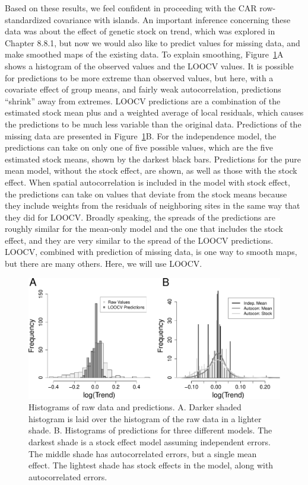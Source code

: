 \documentclass[12pt, titlepage]{article}
\begin{document}
Based on these results, we feel confident in proceeding with the CAR row-standardized covariance with islands.  An important inference concerning these data was about the effect of genetic stock on trend, which was explored in Chapter 8.8.1, but now we would also like to predict values for missing data, and make smoothed maps of the existing data.  To explain smoothing, Figure~\ref{Fig:seals_predhisto}A shows a histogram of the observed values and the LOOCV values.  It is possible for predictions to be more extreme than observed values, but here, with a covariate effect of group means, and fairly weak autocorrelation, predictions ``shrink'' away from extremes.  LOOCV predictions are a combination of the estimated stock mean plus and a weighted average of local residuals, which causes the predictions to be much less variable than the original data.  Predictions of the missing data are presented in Figure~\ref{Fig:seals_predhisto}B. For the independence model, the predictions can take on only one of five possible values, which are the five estimated stock means, shown by the darkest black bars.  Predictions for the pure mean model, without the stock effect, are shown, as well as those with the stock effect.  When spatial autocorrelation is included in the model with stock effect, the predictions can take on values that deviate from the stock means because they include weights from the residuals of neighboring sites in the same way that they did for LOOCV.  Broadly speaking, the spreads of the predictions are roughly similar for the mean-only model and the one that includes the stock effect, and they are very similar to the spread of the LOOCV predictions.  LOOCV, combined with prediction of missing data, is one way to smooth maps, but there are many others.  Here, we will use LOOCV.
\begin{figure}[H]
  \begin{center}
	    \includegraphics[width=.9\linewidth]{seal_predhist}
  \end{center}
  \caption{Histograms of raw data and predictions. A. Darker shaded histogram is laid over the histogram of the raw data in a lighter shade.  B. Histograms of predictions for three different models.  The darkest shade is a stock effect model assuming independent errors.  The middle shade has autocorrelated errors, but a single mean effect.  The lightest shade has stock effects in the model, along with autocorrelated errors. \label{Fig:seals_predhisto}}
\end{figure}
\end{document}
